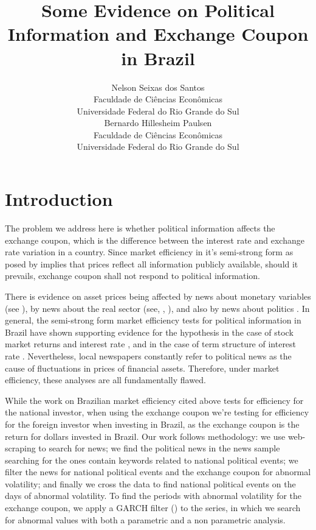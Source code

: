 \documentclass[a4paper]{article}
\title{Some Evidence on Political Information and Exchange Coupon in Brazil}
\author{Nelson Seixas dos Santos\\Faculdade de Ciências Econômicas\\Universidade Federal do Rio Grande do Sul\\Bernardo Hillesheim Paulsen\\Faculdade de Ciências Econômicas\\Universidade Federal do Rio Grande do Sul}
\begin{document}
\maketitle
\clearpage
\tableofcontents
\clearpage
\listoffigures
\clearpage
\listoftables
\clearpage

\begin{abstract}

\end{abstract}


\section{Introduction}

The problem we address here is whether political information affects the exchange coupon, which is the difference between the interest rate and exchange rate variation in a country. Since market efficiency in it's semi-strong form as posed by  \citet{fama1970} implies that prices reflect all information publicly available, should it prevails, exchange coupon shall not respond to political information. 

There is evidence on asset prices being affected by news about monetary variables (see \citet{cornell1983}), by news about the real sector (see, \citet{mcqueenroley1993}, \citet{caporaleetal2015}), and also by news about politics \citet{marquessantos2016}. In general, the semi-strong form market efficiency tests for political information in Brazil have shown supporting evidence for the hypothesis in the case of stock market returns and interest rate \citet{marquessantos2016}, and in the case of term structure of interest rate \citet{santos2018}. Nevertheless, local newspapers constantly refer to political news as the cause of fluctuations in prices of financial assets. Therefore, under market efficiency, these analyses are all fundamentally flawed.

While the work on Brazilian market efficiency cited above tests for efficiency for the national investor, when using the exchange coupon we're testing for efficiency for the foreign investor when investing in Brazil, as the exchange coupon is the return for dollars invested in Brazil. Our work follows \citet{marquessantos2016} methodology: we use web-scraping to search for news; we find the political news in the news sample searching for the ones contain keywords related to national political events; we filter the news for national political events and the exchange coupon for abnormal volatility; and finally we cross the data to find national political events on the days of abnormal volatility. To find the periods with abnormal volatility for the exchange coupon, we apply a GARCH filter (\citet{bollerslev1986}) to the series, in which we search for abnormal values with both a parametric and a non parametric analysis.
\end{document}
